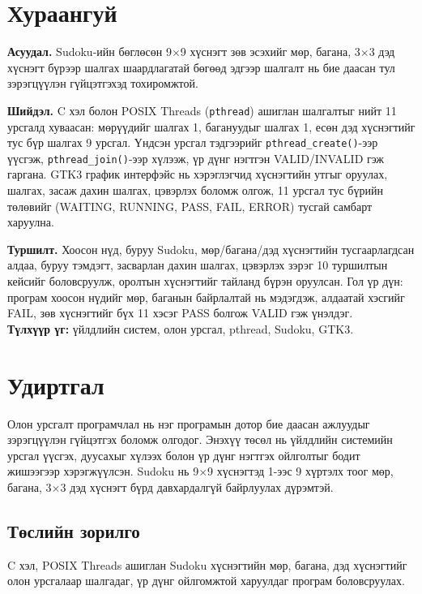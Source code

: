 \documentclass[12pt,a4paper]{report}
\begin{document}
\chapter*{Хураангуй}
\textbf{Асуудал.} Sudoku-ийн бөглөсөн 9$\times$9 хүснэгт зөв эсэхийг мөр, багана, 3$\times$3 дэд хүснэгт бүрээр шалгах шаардлагатай бөгөөд эдгээр шалгалт нь бие даасан тул зэрэгцүүлэн гүйцэтгэхэд тохиромжтой.

\textbf{Шийдэл.} C хэл болон POSIX Threads (\texttt{pthread}) ашиглан шалгалтыг нийт 11 урсгалд хуваасан: мөрүүдийг шалгах 1, багануудыг шалгах 1, есөн дэд хүснэгтийг тус бүр шалгах 9 урсгал. Үндсэн урсгал тэдгээрийг \texttt{pthread\_create()}-ээр үүсгэж, \texttt{pthread\_join()}-ээр хүлээж, үр дүнг нэгтгэн VALID/INVALID гэж гаргана. GTK3 график интерфэйс нь хэрэглэгчид хүснэгтийн утгыг оруулах, шалгах, засаж дахин шалгах, цэвэрлэх боломж олгож, 11 урсгал тус бүрийн төлөвийг (WAITING, RUNNING, PASS, FAIL, ERROR) тусгай самбарт харуулна.

\textbf{Туршилт.} Хоосон нүд, буруу Sudoku, мөр/багана/дэд хүснэгтийн тусгаарлагдсан алдаа, буруу тэмдэгт, засварлан дахин шалгах, цэвэрлэх зэрэг 10 туршилтын кейсийг боловсруулж, оролтын хүснэгтийг тайланд бүрэн оруулсан. Гол үр дүн: програм хоосон нүдийг мөр, баганын байрлалтай нь мэдэгдэж, алдаатай хэсгийг FAIL, зөв хүснэгтийг бүх 11 хэсэг PASS болгож VALID гэж үнэлдэг.\\[0.3em]
\textbf{Түлхүүр үг:} үйлдлийн систем, олон урсгал, pthread, Sudoku, GTK3.

\chapter{Удиртгал}
Олон урсгалт програмчлал нь нэг програмын дотор бие даасан ажлуудыг зэрэгцүүлэн гүйцэтгэх боломж олгодог. Энэхүү төсөл нь үйлдлийн системийн урсгал үүсгэх, дуусахыг хүлээх болон үр дүнг нэгтгэх ойлголтыг бодит жишээгээр хэрэгжүүлсэн. Sudoku нь 9$\times$9 хүснэгтэд 1-ээс 9 хүртэлх тоог мөр, багана, 3$\times$3 дэд хүснэгт бүрд давхардалгүй байрлуулах дүрэмтэй.
\section{Төслийн зорилго}
C хэл, POSIX Threads ашиглан Sudoku хүснэгтийн мөр, багана, дэд хүснэгтийг олон урсгалаар шалгадаг, үр дүнг ойлгомжтой харуулдаг програм боловсруулах.
\end{document}
